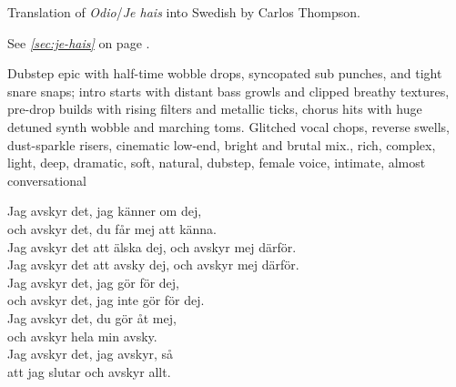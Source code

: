 
\begin{notes}
Translation of \emph{Odio}/\emph{Je hais} into Swedish by Carlos Thompson.

See \emph{\ref{sec:je-hais}} on page \pageref{sec:je-hais}.
\end{notes}
\begin{style}
Dubstep epic with half-time wobble drops, syncopated sub punches, and tight snare snaps; intro starts with distant bass growls and clipped breathy textures, pre-drop builds with rising filters and metallic ticks, chorus hits with huge detuned synth wobble and marching toms. %
Glitched vocal chops, reverse swells, dust-sparkle risers, cinematic low-end, bright and brutal mix., rich, complex, light, deep, dramatic, soft, natural, dubstep, female voice, intimate, almost conversational
\end{style}
\begin{lyrics}Jag avskyr det, jag känner om dej,\\
och avskyr det, du får mej att känna.\\
Jag avskyr det att älska dej, och avskyr mej därför.\\
Jag avskyr det att avsky dej, och avskyr mej därför.\\
Jag avskyr det, jag gör för dej,\\
och avskyr det, jag inte gör för dej.\\
Jag avskyr det, du gör åt mej,\\
och avskyr hela min avsky.\\
Jag avskyr det, jag avskyr, så\\
att jag slutar och avskyr allt.
\end{lyrics}
